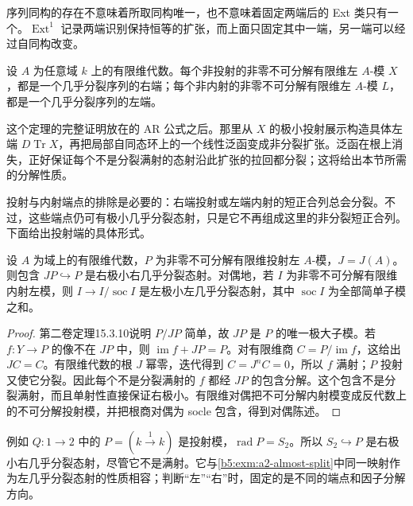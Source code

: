 序列同构的存在不意味着所取同构唯一，也不意味着固定两端后的 Ext 类只有一个。\(\operatorname{Ext}^1\) 记录两端识别保持恒等的扩张，而上面只固定其中一端，另一端可以经过自同构改变。

\begin{theorem}\label{b5:thm:almost-split-existence}
	设 \(A\) 为任意域 \(k\) 上的有限维代数。每个非投射的非零不可分解有限维左 \(A\)-模 \(X\)，都是一个几乎分裂序列的右端；每个非内射的非零不可分解有限维左 \(A\)-模 \(L\)，都是一个几乎分裂序列的左端。
\end{theorem}

这个定理的完整证明放在的 AR 公式之后。那里从 \(X\) 的极小投射展示构造具体左端 \(D\operatorname{Tr}X\)，再把局部自同态环上的一个线性泛函变成非分裂扩张。泛函在根上消失，正好保证每个不是分裂满射的态射沿此扩张的拉回都分裂；这将给出本节所需的分解性质。

\ProseParagraphBreak
投射与内射端点的排除是必要的：右端投射或左端内射的短正合列总会分裂。不过，这些端点仍可有极小几乎分裂态射，只是它不再组成这里的非分裂短正合列。下面给出投射端的具体形式。

\begin{proposition}\label{b5:prop:projective-radical-almost-split}
	设 \(A\) 为域上的有限维代数，\(P\) 为非零不可分解有限维投射左 \(A\)-模，\(J=J(A)\)。则包含 \(JP\hookrightarrow P\) 是右极小右几乎分裂态射。对偶地，若 \(I\) 为非零不可分解有限维内射左模，则 \(I\to I/\operatorname{soc}I\) 是左极小左几乎分裂态射，其中 \(\operatorname{soc}I\) 为全部简单子模之和。
\end{proposition}
\begin{proof}
	第二卷定理15.3.10说明 \(P/JP\) 简单，故 \(JP\) 是 \(P\) 的唯一极大子模。若 \(f:Y\to P\) 的像不在 \(JP\) 中，则 \(\operatorname{im}f+JP=P\)。对有限维商 \(C=P/\operatorname{im}f\)，这给出 \(JC=C\)。有限维代数的根 \(J\) 幂零，迭代得到 \(C=J^nC=0\)，所以 \(f\) 满射；\(P\) 投射又使它分裂。因此每个不是分裂满射的 \(f\) 都经 \(JP\) 的包含分解。这个包含不是分裂满射，而且单射性直接保证右极小。有限维对偶把不可分解内射模变成反代数上的不可分解投射模，并把根商对偶为 socle 包含，得到对偶陈述。
\end{proof}

例如 \(Q:1\to2\) 中的 \(P=(k\xrightarrow{1}k)\) 是投射模，\(\operatorname{rad}P=S_2\)。所以 \(S_2\hookrightarrow P\) 是右极小右几乎分裂态射，尽管它不是满射。它与\cref{b5:exm:a2-almost-split}中同一映射作为左几乎分裂态射的性质相容；判断“左”“右”时，固定的是不同的端点和因子分解方向。
